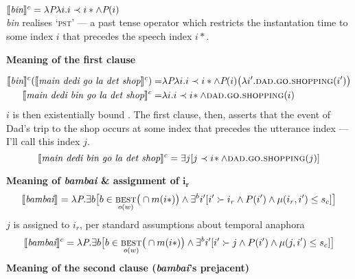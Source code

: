  $\denote[c]{\textit{bin}}= \lambda\textit{P}\lambda i.i\prec i*\wedge\textit{P}(i)$\\
 \textit{bin} realises `\textsc{pst}' --- a past tense operator which restricts the instantation time to some index $ i $ that precedes the speech index $ i* $.
 

\a \textbf{Meaning of the first clause}

\begin{align*}
\denote[c]{\textit{bin}}(\denote[c]{\textit{main dedi go la det shop}})=&\lambda\textit{P}\lambda i.i\prec i*\wedge\textit{P}(i)\big(\lambda i'.\textsc{dad.go.shopping}(i')\big)\\
\denote[c]{\textit{main dedi bin go la det shop}}=&\lambda i.i\prec i\!*\wedge \textsc{dad.go.shopping}(i)%
\end{align*}
$ i $ is then existentially bound \citep{Dowty1979,Stump1985,Ogihara1996}. The first clause, then, asserts that the event of Dad's trip to the shop occurs at some index that precedes the utterance index --- I'll call this index $ j $.
$$ \denote[c]{\textit{main dedi bin go la det shop}}=\exists j[j\prec i\!*\wedge \textsc{dad.go.shopping}(j)] $$




\a \textbf{Meaning of \textit{bambai} \& assignment of $ \boldsymbol{i_r} $}
$$	\denote{\textit{bambai}}=\lambda\textit{P}.\exists b
	\big[b\in\underset{o(w)}{\textsc{best}}\big(\cap m(i*)\big)\wedge \exists^b i'[i'\succ i_r\wedge P(i')\wedge\mu(i_r,i')\leq s_c]\big]$$
	$ j $ is assigned to $ i_r $, per standard assumptions about temporal anaphora \citetext{\textit{e.g.}, \citealt{Hinrihcs1986,Partee}, these insights have been implemented in DRT frameworks \S~\ref{bambai.subord}, see chapter 5 of \citealt{Kamp1993}.}
$$	\denote[c]{\textit{bambai}}=\lambda\textit{P}.\exists b
	\big[b\in\underset{o(w)}{\textsc{best}}\big(\cap m(i*)\big)\wedge \exists^b i'[i'\succ j\wedge P(i')\wedge\mu(j,i')\leq s_c]\big]$$
\a{} \textbf{Meaning of the second clause (\textit{bambai}'s prejacent)}

